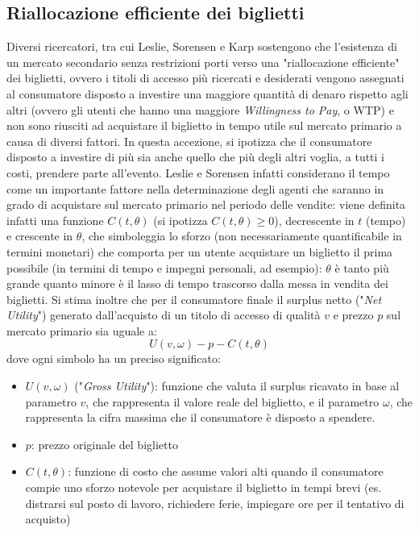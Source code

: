 \subsection{Riallocazione efficiente dei biglietti}
Diversi ricercatori, tra cui Leslie, Sorensen \cite{leslie2013resale, leslie2009welfare} e Karp \cite{karp2005promoters} sostengono che l'esistenza di un mercato secondario senza restrizioni porti verso una "riallocazione efficiente" dei biglietti, ovvero i titoli di accesso più ricercati e desiderati vengono assegnati al consumatore disposto a investire una maggiore quantità di denaro rispetto agli altri (ovvero gli utenti che hanno una maggiore \textit{Willingness to Pay}, o WTP) e non sono riusciti ad acquistare il biglietto in tempo utile sul mercato primario a causa di diversi fattori. In questa accezione, si ipotizza che il consumatore disposto a investire di più sia anche quello che più degli altri voglia, a tutti i costi, prendere parte all'evento. Leslie e Sorensen infatti considerano il tempo come un importante fattore nella determinazione degli agenti che saranno in grado di acquistare sul mercato primario nel periodo delle vendite: viene definita infatti una funzione $C(t, \theta)$ (si ipotizza $C(t, \theta) \geq{0} $), decrescente in $t$ (tempo) e crescente in $\theta$, che simboleggia lo sforzo (non necessariamente quantificabile in termini monetari) che comporta per un utente acquistare un biglietto il prima possibile (in termini di tempo e impegni personali, ad esempio): $\theta$ è tanto più grande quanto minore è il lasso di tempo trascorso dalla messa in vendita dei biglietti. Si stima inoltre che per il consumatore finale il surplus netto ("\textit{Net Utility}") generato dall'acquisto di un titolo di accesso di qualità $v$ e prezzo $p$ sul mercato primario sia uguale a: 
\begin{equation}
	U(v, \omega) - p - C(t, \theta)
\end{equation}
dove ogni simbolo ha un preciso significato: 
\begin{itemize}
\item $U(v, \omega)$ ("\textit{Gross Utility}"): funzione che valuta il surplus ricavato in base al parametro $v$, che rappresenta il valore reale del biglietto, e il parametro $\omega$, che rappresenta la cifra massima che il consumatore è disposto a spendere. 
\item $p$: prezzo originale del biglietto
\item $C(t, \theta)$: funzione di costo che assume valori alti quando il consumatore compie uno sforzo notevole per acquistare il biglietto in tempi brevi (es. distrarsi sul posto di lavoro, richiedere ferie, impiegare ore per il tentativo di acquisto)
\end{itemize}
